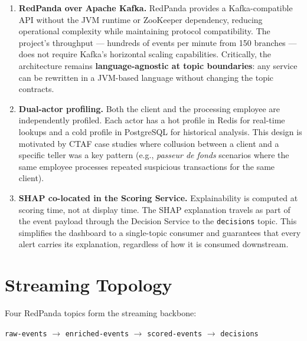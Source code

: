 \begin{enumerate}[leftmargin=2cm]
    \item \textbf{RedPanda over Apache Kafka.} RedPanda provides a Kafka-compatible
          API without the JVM runtime or ZooKeeper dependency, reducing operational
          complexity while maintaining protocol compatibility. The project's throughput
          --- hundreds of events per minute from 150 branches --- does not require
          Kafka's horizontal scaling capabilities. Critically, the architecture remains
          \textbf{language-agnostic at topic boundaries}: any service can be rewritten
          in a JVM-based language without changing the topic contracts.

    \item \textbf{Dual-actor profiling.} Both the client and the processing employee
          are independently profiled. Each actor has a hot profile in Redis for
          real-time lookups and a cold profile in PostgreSQL for historical analysis.
          This design is motivated by CTAF case studies where collusion between a
          client and a specific teller was a key pattern (e.g., \textit{passeur de fonds}
          scenarios where the same employee processes repeated suspicious transactions
          for the same client).

    \item \textbf{SHAP co-located in the Scoring Service.} Explainability is computed
          at scoring time, not at display time. The SHAP explanation travels as part
          of the event payload through the Decision Service to the \texttt{decisions}
          topic. This simplifies the dashboard to a single-topic consumer and guarantees
          that every alert carries its explanation, regardless of how it is consumed
          downstream.
\end{enumerate}

\section{Streaming Topology}

Four RedPanda topics form the streaming backbone:

\begin{center}
\texttt{raw-events} $\rightarrow$ \texttt{enriched-events} $\rightarrow$
\texttt{scored-events} $\rightarrow$ \texttt{decisions}
\end{center}

